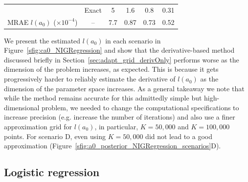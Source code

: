 \documentclass[a4paper, notitlepage, 11pt]{article}
\begin{document}
\begin{table}[!ht]
\begin{center}
{\begin{tabular}{cccccc}
                                                              & Exact                       & 5                 & 1.6                 & 0.8                 & 0.31 \\ 
                                                               MRAE $l(a_0)$ ($\times 10^{-4}$) & -- & 7.7               & 0.87                & 0.73                & 0.52                  \\\hline                
\end{tabular}
}
\end{center}
\end{table}

We present the estimated $l(a_0)$ in each scenario in Figure~\ref{sfig:ca0_NIGRegression} and show that the derivative-based method discussed briefly in Section~\ref{sec:adapt_grid_derivOnly} performs worse as the dimension of the problem increases, as expected.
This is because it gets progressively harder to reliably estimate the derivative of $l(a_0)$ as the dimension of the parameter space increases.
As a general takeaway we note that while the method remains accurate for this admittedly simple but high-dimensional problem, we needed to change the computational specifications to increase precision (e.g. increase the number of iterations) and also use a finer approximation grid for $l(a_0)$, in particular, $K = 50, 000$ and $K = 100, 000$ points.
For scenario D, even using $K = 50, 000$ did not lead to a good approximation (Figure~\ref{sfig:a0_posterior_NIGRegression_scenarios}D).


\subsection{Logistic regression}
\label{sec:logistic_regression}
\end{document}
